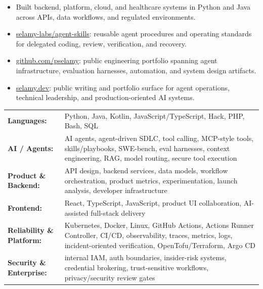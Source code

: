 \begin{itemize}
  \item Built backend, platform, cloud, and healthcare systems in Python and Java across APIs, data workflows, and regulated environments.
\end{itemize}

\begin{itemize}
  \item \href{https://github.com/selamy-labs/agent-skills}{selamy-labs/agent-skills}: reusable agent procedures and operating standards for delegated coding, review, verification, and recovery.
  \item \href{https://github.com/pselamy}{github.com/pselamy}: public engineering portfolio spanning agent infrastructure, evaluation harnesses, automation, and system design artifacts.
  \item \href{https://selamy.dev}{selamy.dev}: public writing and portfolio surface for agent operations, technical leadership, and production-oriented AI systems.
\end{itemize}

{\renewcommand{\arraystretch}{1.22}%
\begin{tabularx}{\linewidth}{@{}>{\bfseries}l X@{}}
Languages: & Python, Java, Kotlin, JavaScript/TypeScript, Hack, PHP, Bash, SQL \\
AI / Agents: & AI agents, agent-driven SDLC, tool calling, MCP-style tools, skills/playbooks, SWE-bench, eval harnesses, context engineering, RAG, model routing, secure tool execution \\
Product \& Backend: & API design, backend services, data models, workflow orchestration, product metrics, experimentation, launch analysis, developer infrastructure \\
Frontend: & React, TypeScript, JavaScript, product UI collaboration, AI-assisted full-stack delivery \\
Reliability \& Platform: & Kubernetes, Docker, Linux, GitHub Actions, Actions Runner Controller, CI/CD, observability, traces, metrics, logs, incident-oriented verification, OpenTofu/Terraform, Argo CD \\
Security \& Enterprise: & internal IAM, auth boundaries, insider-risk systems, credential brokering, trust-sensitive workflows, privacy/security review gates \\
\end{tabularx}}

